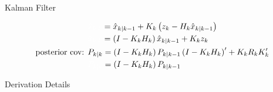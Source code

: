 \begin{algorithm}{Kalman Filter}
\begin{enumerate}[topsep=2pt,itemsep=2pt]
\begin{enumerate}[topsep=2pt,itemsep=2pt]
\begin{align}
                &{\color{white}\hat{x}_{k|k}}=\hat{x}_{k|k-1}+K_k\left(z_k-H_k\hat{x}_{k|k-1}\right)\\
                &{\color{white}\hat{x}_{k|k}}=\left(I-K_kH_k\right)\hat{x}_{k|k-1}+K_kz_k\\
                \text{posterior cov: }&P_{k|k}=\left(I-K_kH_k\right)P_{k|k-1}\left(I-K_kH_k\right)'+K_kR_kK_k'\\
                &{\color{white}P_{k|k}}=\left(I-K_kH_k\right)P_{k|k-1}
            \end{align}
        \end{enumerate}
    \end{enumerate}
\end{algorithm}
    

\begin{point}
    Derivation Details
\end{point}

